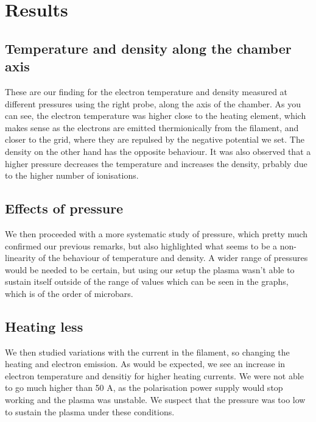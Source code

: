\section{Results}
\subsection{Temperature and density along the chamber axis}
These are our finding for the electron temperature and density measured at different pressures using the right probe, along the axis of the chamber.
As you can see, the electron temperature was higher close to the heating element, which makes sense as the electrons are emitted thermionically from the filament, and closer to the grid, where they are repulsed by the negative potential we set.
The density on the other hand has the opposite behaviour.
It was also observed that a higher pressure decreases the temperature and increases the density, prbably due to the higher number of ionisations.

\subsection{Effects of pressure}
We then proceeded with a more systematic study of pressure, which pretty much confirmed our previous remarks, but also highlighted what seems to be a non-linearity of the behaviour of temperature and density.
A wider range of pressures would be needed to be certain, but using our setup the plasma wasn't able to sustain itself outside of the range of values which can be seen in the graphs, which is of the order of microbars.

\subsection{Heating less}
We then studied variations with the current in the filament, so changing the heating and electron emission. As would be expected, we see an increase in electron temperature and densitiy for higher heating currents. We were not able to go much higher than 50 A, as the polarisation power supply would stop working and the plasma was unstable. We suspect that the pressure was too low to sustain the plasma under these conditions.


